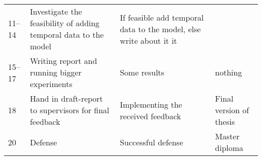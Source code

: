 \documentclass{article}
\begin{document}
\begin{table}[htp]
\begin{center}
\begin{tabular}{p{}p{}p{}p{}}
      11--14 & Investigate the feasibility of adding temporal data to the model & If                                                                                                                                                                                      feasible add                                           temporal data to the model, else write about it it                                                                                        \\
      15--17 & Writing report and running bigger experiments                    & Some results                                                                                                                                                                                                                                                                                      & nothing                                                                              \\
      18     & Hand in draft-report to supervisors for final feedback           & Implementing the received feedback                                                                                                                                                                                                                                                                & Final version of thesis                                                              \\
      20     & Defense                                                          & Successful defense                                                                                                                                                                                                                                                                                & Master diploma                                                                       \\
      \hline
    \end{tabular}
  \end{center}
\end{table}


\end{document}
